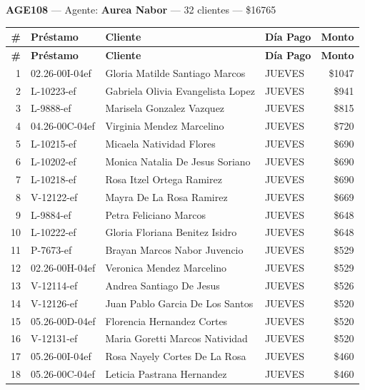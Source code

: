 \documentclass[11pt,a4paper]{article}
\newcommand{\money}[1]{\$\num{#1}}
\begin{document}
\noindent\textbf{AGE108} --- Agente: \textbf{Aurea Nabor} --- 32 clientes --- \money{16765}


\begin{center}
\renewcommand{\arraystretch}{1.1}
\footnotesize
\begin{longtable}{rlp{6.5cm}lr}
\toprule
\textbf{\#} & \textbf{Pr\'estamo} & \textbf{Cliente} & \textbf{D\'ia Pago} & \textbf{Monto} \\
\midrule
\endfirsthead
\toprule
\textbf{\#} & \textbf{Pr\'estamo} & \textbf{Cliente} & \textbf{D\'ia Pago} & \textbf{Monto} \\
\midrule
\endhead
1 & 02.26-00I-04ef & Gloria Matilde Santiago Marcos & JUEVES & \money{1047} \\
2 & L-10223-ef & Gabriela Olivia Evangelista Lopez & JUEVES & \money{941} \\
3 & L-9888-ef & Marisela Gonzalez Vazquez & JUEVES & \money{815} \\
4 & 04.26-00C-04ef & Virginia Mendez Marcelino & JUEVES & \money{720} \\
5 & L-10215-ef & Micaela Natividad Flores & JUEVES & \money{690} \\
6 & L-10202-ef & Monica Natalia De Jesus Soriano & JUEVES & \money{690} \\
7 & L-10218-ef & Rosa Itzel Ortega Ramirez & JUEVES & \money{690} \\
8 & V-12122-ef & Mayra De La Rosa Ramirez & JUEVES & \money{669} \\
9 & L-9884-ef & Petra Feliciano Marcos & JUEVES & \money{648} \\
10 & L-10222-ef & Gloria Floriana Benitez Isidro & JUEVES & \money{648} \\
11 & P-7673-ef & Brayan Marcos Nabor Juvencio & JUEVES & \money{529} \\
12 & 02.26-00H-04ef & Veronica Mendez Marcelino & JUEVES & \money{529} \\
13 & V-12114-ef & Andrea Santiago De Jesus & JUEVES & \money{526} \\
14 & V-12126-ef & Juan Pablo Garcia De Los Santos & JUEVES & \money{520} \\
15 & 05.26-00D-04ef & Florencia Hernandez Cortes & JUEVES & \money{520} \\
16 & V-12131-ef & Maria Goretti Marcos Natividad & JUEVES & \money{520} \\
17 & 05.26-00I-04ef & Rosa Nayely Cortes De La Rosa & JUEVES & \money{460} \\
18 & 05.26-00C-04ef & Leticia Pastrana Hernandez & JUEVES & \money{460} \\

\end{longtable}
\end{center}
\end{document}
